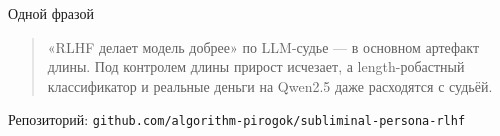 \documentclass[aspectratio=169,11pt]{beamer}
\begin{document}
\begin{frame}{Одной фразой}
\begin{quote}
\large «RLHF делает модель добрее» по LLM-судье — в основном артефакт длины. Под контролем длины прирост исчезает, а length-робастный классификатор и реальные деньги на Qwen2.5 даже расходятся с судьёй.
\end{quote}
\vfill
\centering\footnotesize Репозиторий: \texttt{github.com/algorithm-pirogok/subliminal-persona-rlhf}
\end{frame}
\end{document}
